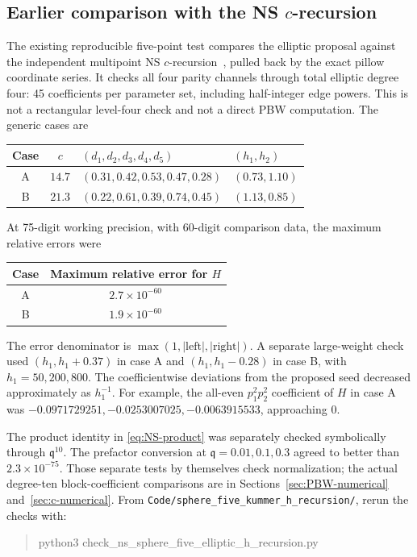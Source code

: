 \documentclass[11pt]{article}
\numberwithin{equation}{section}
\newcommand{\fq}{\mathfrak q}
\begin{document}
\subsection{Earlier comparison with the NS \texorpdfstring{$c$}{c}-recursion}

The existing reproducible five-point test compares the elliptic proposal
against the independent multipoint NS $c$-recursion~\cite{BG}, pulled
back by the exact pillow coordinate series. It checks all four parity
channels through total elliptic degree four: 45 coefficients per parameter
set, including half-integer edge powers. This is not a rectangular
level-four check and not a direct PBW computation. The generic cases are
\begin{center}
\begin{tabular}{@{}ccll@{}}
\toprule
Case & $c$ & $(d_1,d_2,d_3,d_4,d_5)$ & $(h_1,h_2)$\\
\midrule
A & $14.7$ & $(0.31,0.42,0.53,0.47,0.28)$ & $(0.73,1.10)$\\
B & $21.3$ & $(0.22,0.61,0.39,0.74,0.45)$ & $(1.13,0.85)$\\
\bottomrule
\end{tabular}
\end{center}
At 75-digit working precision, with 60-digit comparison data, the maximum
relative errors were
\begin{center}
\begin{tabular}{@{}cc@{}}
\toprule
Case & Maximum relative error for $H$\\
\midrule
A & $2.7\times10^{-60}$\\
B & $1.9\times10^{-60}$\\
\bottomrule
\end{tabular}
\end{center}
The error denominator is $\max(1,|\text{left}|,|\text{right}|)$.
A separate large-weight check used $(h_1,h_1+0.37)$ in case A and
$(h_1,h_1-0.28)$ in case B, with $h_1=50,200,800$. The coefficientwise
deviations from the proposed seed decreased approximately as $h_1^{-1}$.
For example, the all-even $p_1^2p_2^2$ coefficient of
$H$ in case A was
$-0.0971729251,-0.0253007025,-0.0063915533$, approaching $0$.

The product identity in \eqref{eq:NS-product} was separately checked
symbolically through $\fq^{10}$. The prefactor conversion at
$\fq=0.01,0.1,0.3$ agreed to better than $2.3\times10^{-75}$.
Those separate tests by themselves check normalization; the actual
degree-ten block-coefficient comparisons are in
Sections~\ref{sec:PBW-numerical} and~\ref{sec:c-numerical}.
From \nolinkurl{Code/sphere_five_kummer_h_recursion/}, rerun the checks with:
\begin{quote}\small\ttfamily
python3 check\_ns\_sphere\_five\_elliptic\_h\_recursion.py
\end{quote}
\end{document}
